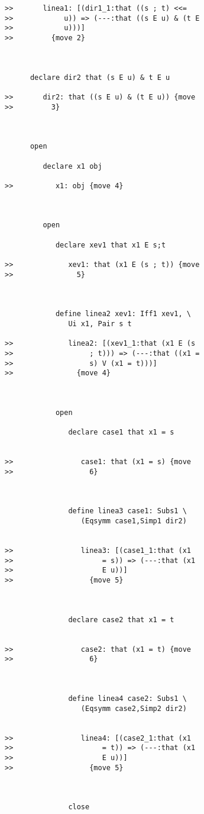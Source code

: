 \documentclass[12pt]{article}
\begin{document}
\begin{verbatim}
>>       linea1: [(dir1_1:that ((s ; t) <<=
>>            u)) => (---:that ((s E u) & (t E
>>            u)))]
>>         {move 2}



      declare dir2 that (s E u) & t E u

>>       dir2: that ((s E u) & (t E u)) {move
>>         3}



      open

         declare x1 obj

>>          x1: obj {move 4}



         open

            declare xev1 that x1 E s;t

>>             xev1: that (x1 E (s ; t)) {move
>>               5}



            define linea2 xev1: Iff1 xev1, \
               Ui x1, Pair s t

>>             linea2: [(xev1_1:that (x1 E (s
>>                  ; t))) => (---:that ((x1 =
>>                  s) V (x1 = t)))]
>>               {move 4}



            open

               declare case1 that x1 = s


>>                case1: that (x1 = s) {move
>>                  6}



               define linea3 case1: Subs1 \
                  (Eqsymm case1,Simp1 dir2)


>>                linea3: [(case1_1:that (x1
>>                     = s)) => (---:that (x1
>>                     E u))]
>>                  {move 5}



               declare case2 that x1 = t


>>                case2: that (x1 = t) {move
>>                  6}



               define linea4 case2: Subs1 \
                  (Eqsymm case2,Simp2 dir2)


>>                linea4: [(case2_1:that (x1
>>                     = t)) => (---:that (x1
>>                     E u))]
>>                  {move 5}



               close


\end{verbatim}
\end{document}
